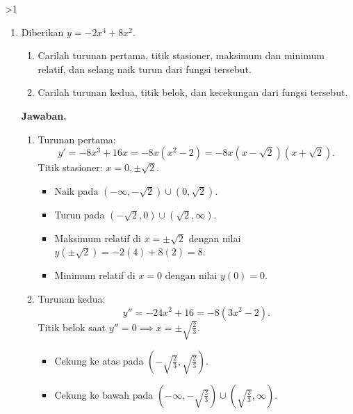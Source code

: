 \documentclass[12pt]{article}
\newcommand{\answername}{Jawaban}
\newenvironment{soaljawab}[1]{%
    \ifnum#1>1\clearpage\fi
    \begin{tcolorbox}[enhanced,breakable,height fill,height fixed for=all,
        sharp corners,colback=white,colframe=black,boxrule=0.4bp,
        boxsep=0pt,left=12bp,right=12bp,top=6bp,bottom=10bp,
        before skip=0pt,after skip=0pt,pad at break=8bp]
    \fontsize{12bp}{14bp}\selectfont
    \setlength{\abovedisplayskip}{8bp}
    \setlength{\belowdisplayskip}{8bp}
    \setlength{\abovedisplayshortskip}{8bp}
    \setlength{\belowdisplayshortskip}{8bp}
    \renewcommand{\arraystretch}{1.15}
    \begin{enumerate}[start=#1,topsep=0pt]
}{%
    \end{enumerate}
    \end{tcolorbox}
}
\newcommand{\jawaban}{\par\medskip\textbf{\answername.}\par\smallskip}
\begin{document}
\begin{soaljawab}{2}
\item Diberikan $y = -2x^4 + 8x^2$.
        \begin{enumerate}
          \item Carilah turunan pertama, titik stasioner, maksimum dan minimum relatif, dan selang naik turun dari fungsi tersebut.
          \item Carilah turunan kedua, titik belok, dan kecekungan dari fungsi tersebut.
        \end{enumerate}
\jawaban
\begin{enumerate}
          \item Turunan pertama:
                \[
                  y' = -8x^3 + 16x = -8x(x^2 - 2) = -8x(x - \sqrt{2})(x + \sqrt{2}).
                \]
                Titik stasioner: $x = 0, \pm\sqrt{2}$.
                \begin{itemize}
                  \item Naik pada $(-\infty, -\sqrt{2}) \cup (0, \sqrt{2})$.
                  \item Turun pada $(-\sqrt{2}, 0) \cup (\sqrt{2}, \infty)$.
                  \item Maksimum relatif di $x = \pm\sqrt{2}$ dengan nilai $y(\pm\sqrt{2}) = -2(4) + 8(2) = 8$.
                  \item Minimum relatif di $x = 0$ dengan nilai $y(0) = 0$.
                \end{itemize}
          \item Turunan kedua:
                \[
                  y'' = -24x^2 + 16 = -8(3x^2 - 2).
                \]
                Titik belok saat $y'' = 0 \implies x = \pm\sqrt{\frac{2}{3}}$.
                \begin{itemize}
                  \item Cekung ke atas pada $\left(-\sqrt{\frac{2}{3}}, \sqrt{\frac{2}{3}}\right)$.
                  \item Cekung ke bawah pada $\left(-\infty, -\sqrt{\frac{2}{3}}\right) \cup \left(\sqrt{\frac{2}{3}}, \infty\right)$.
                \end{itemize}
        \end{enumerate}
\end{soaljawab}
\end{document}
